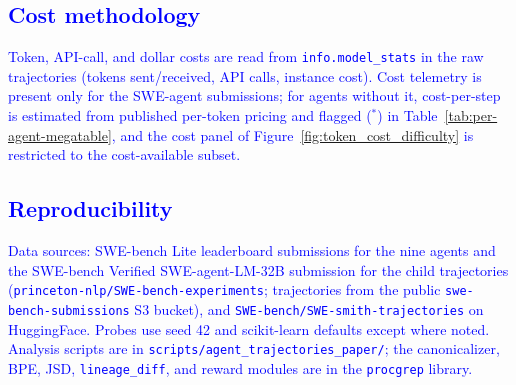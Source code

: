 \documentclass[12pt]{article}
\begin{document}
\subsection{\textcolor{blue}{Cost methodology}}
\textcolor{blue}{Token, API-call, and dollar costs are read from \texttt{info.model\_stats} in the raw trajectories (tokens sent/received, API calls, instance cost). Cost telemetry is present only for the SWE-agent submissions; for agents without it, cost-per-step is estimated from published per-token pricing and flagged ($^*$) in Table~\ref{tab:per-agent-megatable}, and the cost panel of Figure~\ref{fig:token_cost_difficulty} is restricted to the cost-available subset.}

\subsection{\textcolor{blue}{Reproducibility}}
\textcolor{blue}{Data sources: SWE-bench Lite leaderboard submissions for the nine agents and the SWE-bench Verified SWE-agent-LM-32B submission for the child trajectories (\texttt{princeton-nlp/SWE-bench-experiments}; trajectories from the public \texttt{swe-bench-submissions} S3 bucket), and \texttt{SWE-bench/SWE-smith-trajectories} on HuggingFace. Probes use seed 42 and scikit-learn defaults except where noted. Analysis scripts are in \texttt{scripts/agent\_trajectories\_paper/}; the canonicalizer, BPE, JSD, \texttt{lineage\_diff}, and reward modules are in the \texttt{procgrep} library.}



\end{document}
